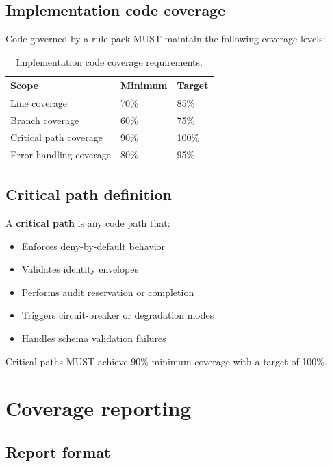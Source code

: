 \subsection{Implementation code coverage}

Code governed by a rule pack MUST maintain the following coverage levels:

\begin{table}[htbp]
\centering
\footnotesize
\caption{Implementation code coverage requirements.}
\label{tab:code-coverage}
\begin{tabularx}{\textwidth}{@{}l l X@{}}
\toprule
\textbf{Scope} & \textbf{Minimum} & \textbf{Target} \\
\midrule
Line coverage & 70\% & 85\% \\
Branch coverage & 60\% & 75\% \\
Critical path coverage & 90\% & 100\% \\
Error handling coverage & 80\% & 95\% \\
\bottomrule
\end{tabularx}
\end{table}

\subsection{Critical path definition}

A \textbf{critical path} is any code path that:
\begin{itemize}
  \item Enforces deny-by-default behavior
  \item Validates identity envelopes
  \item Performs audit reservation or completion
  \item Triggers circuit-breaker or degradation modes
  \item Handles schema validation failures
\end{itemize}

Critical paths MUST achieve 90\% minimum coverage with a target of 100\%.

\section{Coverage reporting}

\subsection{Report format}

